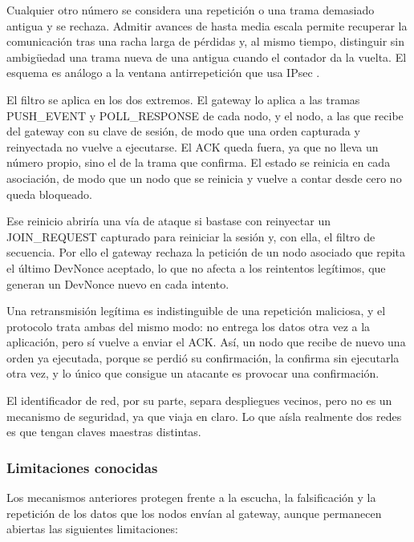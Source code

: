 Cualquier otro número se considera una repetición o una trama demasiado antigua y se rechaza. Admitir avances de hasta media escala permite recuperar la comunicación tras una racha larga de pérdidas y, al mismo tiempo, distinguir sin ambigüedad una trama nueva de una antigua cuando el contador da la vuelta. El esquema es análogo a la ventana antirrepetición que usa IPsec \cite{rfc4303}.

El filtro se aplica en los dos extremos. El gateway lo aplica a las tramas PUSH\_EVENT y POLL\_RESPONSE de cada nodo, y el nodo, a las que recibe del gateway con su clave de sesión, de modo que una orden capturada y reinyectada no vuelve a ejecutarse. El ACK queda fuera, ya que no lleva un número propio, sino el de la trama que confirma. El estado se reinicia en cada asociación, de modo que un nodo que se reinicia y vuelve a contar desde cero no queda bloqueado.


Ese reinicio abriría una vía de ataque si bastase con reinyectar un JOIN\_REQUEST capturado para reiniciar la sesión y, con ella, el filtro de secuencia. Por ello el gateway rechaza la petición de un nodo asociado que repita el último DevNonce aceptado, lo que no afecta a los reintentos legítimos, que generan un DevNonce nuevo en cada intento.

Una retransmisión legítima es indistinguible de una repetición maliciosa, y el protocolo trata ambas del mismo modo: no entrega los datos otra vez a la aplicación, pero sí vuelve a enviar el ACK. Así, un nodo que recibe de nuevo una orden ya ejecutada, porque se perdió su confirmación, la confirma sin ejecutarla otra vez, y lo único que consigue un atacante es provocar una confirmación.

El identificador de red, por su parte, separa despliegues vecinos, pero no es un mecanismo de seguridad, ya que viaja en claro. Lo que aísla realmente dos redes es que tengan claves maestras distintas.

\subsubsection{Limitaciones conocidas}\label{sec:limitaciones-seg}

Los mecanismos anteriores protegen frente a la escucha, la falsificación y la repetición de los datos que los nodos envían al gateway, aunque permanecen abiertas las siguientes limitaciones:



